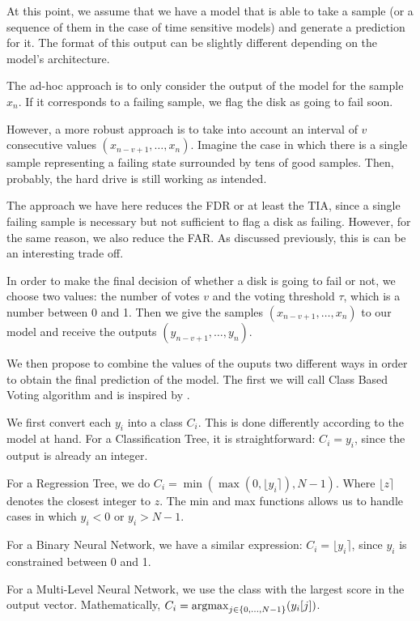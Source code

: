At this point, we assume that we have a model that is able to take a sample (or a sequence of them in the case of time sensitive models) and generate a prediction for it.
The format of this output can be slightly different depending on the model's architecture.

The ad-hoc approach is to only consider the output of the model for the sample $x_n$.
If it corresponds to a failing sample, we flag the disk as going to fail soon.

However, a more robust approach is to take into account an interval of $v$ consecutive values $(x_{n-v+1},\dots,x_n)$.
Imagine the case in which there is a single sample representing a failing state surrounded by tens of good samples.
Then, probably, the hard drive is still working as intended.

The approach we have here reduces the FDR or at least the TIA, since a single failing sample is necessary but not sufficient to flag a disk as failing.
However, for the same reason, we also reduce the FAR.
As discussed previously, this is can be an interesting trade off.

In order to make the final decision of whether a disk is going to fail or not, we choose two values: the number of votes $v$ and the voting threshold $\tau$, which is a number between 0 and 1.
Then we give the samples $(x_{n-v+1},\dots,x_n)$ to our model and receive the outputs $(y_{n-v+1},\dots,y_n)$.

We then propose to combine the values of the ouputs two different ways in order to obtain the final prediction of the model.
The first we will call Class Based Voting algorithm and is inspired by \cite{Xu16}.

We first convert each $y_i$ into a class $C_i$.
This is done differently according to the model at hand.
For a Classification Tree, it is straightforward: $C_i = y_i$, since the output is already an integer.

For a Regression Tree, we do $C_i = \min(\max(0, \lfloor y_i \rceil), N-1)$.
Where $\lfloor z \rceil$ denotes the closest integer to $z$.
The min and max functions allows us to handle cases in which $y_i < 0$ or $y_i > N-1$.

For a Binary Neural Network, we have a similar expression: $C_i = \lfloor y_i \rceil$, since $y_i$ is constrained between 0 and 1.

For a Multi-Level Neural Network, we use the class with the largest score in the output vector.
Mathematically, $C_i = \operatorname*{argmax}_{j\in\{0,\dots,N-1\}}(y_i[j])$.

